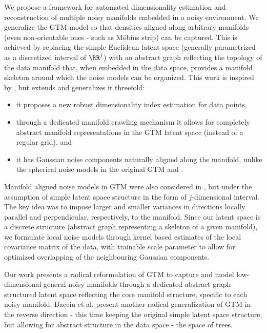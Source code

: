 We propose a framework for automated dimensionality estimation and reconstruction of multiple noisy manifolds embedded in a noisy environment. We generalize the GTM model so that densities aligned along arbitrary manifolds (even non-orientable ones - such as M\"{o}bius strip) can be captured.
This is achieved by replacing the simple Euclidean latent space (generally parametrized as a discretized interval of $\RR^j$) with an abstract graph reflecting the topology of the data manifold that, when embedded in the data space, provides a manifold skeleton around which the noise models can be organized.
This work is inspired by \cite{10.1007/978-3-540-87481-2_37}, but extends and generalizes it threefold: 
\begin{itemize}
 \item it proposes a new robust dimensionality index estimation for data points,
 \item through a dedicated manifold crawling mechanism it allows for completely abstract manifold representations in the GTM latent space (instead of a regular grid), and
 \item it has Gaussian noise components naturally aligned along the manifold, unlike the spherical noise models in the original GTM and \cite{10.1007/978-3-540-87481-2_37}.
\end{itemize}
Manifold aligned noise models in GTM were also considered in 
\cite{Bishop1998DevelopmentsOT},
but under the assumption of simple latent space structure in the form of $j$-dimensional interval. The key idea was to impose larger and smaller variances in directions locally parallel and perpendicular, respectively, to the manifold. Since our latent space is a discrete structure (abstract graph representing a skeleton of a given manifold), we formulate local noise models through kernel based estimates of the local covariance matrix of the data, with trainable scale parameter to allow for optimized overlapping of the neighbouring Gaussian components. 

Our work presents a radical reformulation of GTM to capture and model low-dimensional general noisy manifolds through a dedicated abstract graph-structured latent space reflecting the core manifold structure, specific to each noisy manifold. Bacciu et al. \cite{Bacciu13} present another radical generalization of GTM in the reverse direction - this time keeping the original simple latent space structure, but allowing for abstract structure in the data space - the space of trees.

